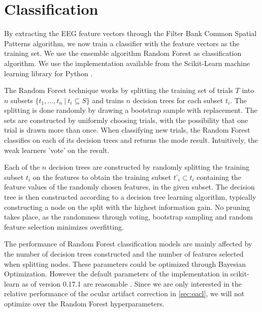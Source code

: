 \section{Classification}\label{sec:randomforest}
By extracting the EEG feature vectors through the Filter Bank Common Spatial Patterns algorithm, we now train a classifier with the feature vectors as the training set.
We use the ensemble algorithm Random Forest as classification algorithm. We use the implementation available from the Scikit-Learn machine learning library for Python \cite{scikit-learn}.

The Random Forest technique works by splitting the training set of trials $T$ into $n$ subsets $\{t_1,…,t_n \ | \ t_i \subseteq S\}$ and trains $n$ decision trees for each subset $t_i$. The splitting is done randomly by drawing a bootstrap sample with replacement. The sets are constructed by uniformly choosing trials, with the possibility that one trial is drawn more than once. When classifying new trials, the Random Forest classifies on each of its decision trees and returns the mode result. Intuitively, the weak learners 'vote' on the result.

Each of the $n$ decision trees are constructed by randomly splitting the training subset $t_i$ on the features to obtain the training subset $t’_i \subset t_i$ containing the feature values of the randomly chosen features, in the given subset. The decision tree is then constructed according to a decision tree learning algorithm, typically constructing a node on the split with the highest information gain. No pruning takes place, as the randomness through voting, bootstrap sampling and random feature selection minimizes overfitting.

The performance of Random Forest classification models are mainly affected by the number of decision trees constructed and the number of features selected when splitting nodes. These parameters could be optimized through Bayesian Optimization. However the default parameters of the implementation in scikit-learn \citep{scikit-learn} as of version 0.17.1 are reasonable \citep{bernard2009influence}. Since we are only interested in the relative performance of the ocular artifact correction in \cref{sec:oacl}, we will not optimize over the Random Forest hyperparameters.
